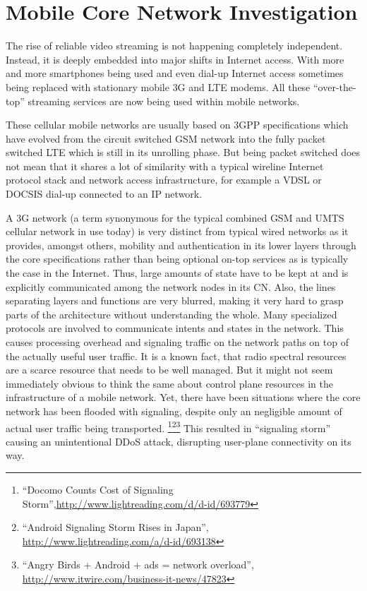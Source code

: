 \chapter{Mobile Core Network Investigation}
\label{chap:mobilenets}

The rise of reliable video streaming is not happening completely independent. Instead, it is deeply embedded into major shifts in Internet access. With more and more smartphones being used and even dial-up Internet access sometimes being replaced with stationary mobile \gls{3G} and \gls{LTE} modems. All these ``over-the-top'' streaming services are now being used within mobile networks.  

These cellular mobile networks are usually based on \gls{3GPP} specifications which have evolved from the circuit switched \gls{GSM} network into the fully packet switched \gls{LTE} which is still in its unrolling phase. But being packet switched does not mean that it shares a lot of similarity with a typical wireline Internet protocol stack and network access infrastructure, for example a \gls{VDSL} or \gls{DOCSIS} dial-up connected to an \gls{IP} network. 

A \gls{3G} network (a term synonymous for the typical combined \gls{GSM} and \gls{UMTS} cellular network in use today) is very distinct from typical wired networks as it provides, amongst others, mobility and authentication in its lower layers through the core specifications rather than being optional on-top services as is typically the case in the Internet.  Thus, large amounts of state have to be kept at and is explicitly communicated among the network nodes in its \gls{CN}. Also, the lines separating layers and functions are very blurred, making it very hard to grasp parts of the architecture without understanding the whole. Many specialized protocols are involved to communicate intents and states in the network. This causes processing overhead and signaling traffic on the network paths on top of the actually useful user traffic. It is a known fact, that radio spectral resources are a scarce resource that needs to be well managed. But it might not seem immediately obvious to think the same about control plane resources in the infrastructure of a mobile network. Yet, there have been situations where the core network has been flooded with signaling, despite only an negligible amount of actual user traffic being transported. \cite{huawei2011storm} \footnote{``Docomo Counts Cost of Signaling Storm'',\url{http://www.lightreading.com/d/d-id/693779}}\footnote{``Android Signaling Storm Rises in Japan'', \url{http://www.lightreading.com/a/d-id/693138}}\footnote{``Angry Birds + Android + ads = network overload'', \url{http://www.itwire.com/business-it-news/47823}} This resulted in ``signaling storm'' causing an unintentional \gls{DDoS} attack, disrupting user-plane connectivity on its way.


